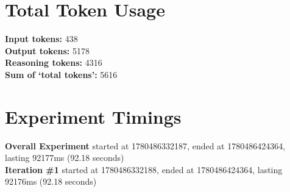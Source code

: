 \documentclass{article}
\begin{document}
\section*{Total Token Usage}
\textbf{Input tokens: }438
\\\textbf{Output tokens: }5178
\\\textbf{Reasoning tokens: }4316
\\\textbf{Sum of `total tokens': }5616
\section*{Experiment Timings}
\textbf{Overall Experiment} started at 1780486332187, ended at 1780486424364, lasting 92177ms (92.18 seconds)
\\\textbf{Iteration \#1} started at 1780486332188, ended at 1780486424364, lasting 92176ms (92.18 seconds)
\end{document}
